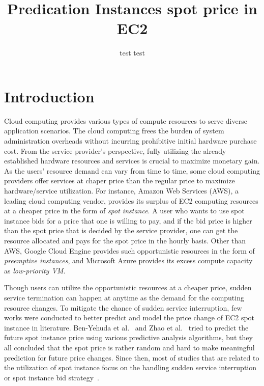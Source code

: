 \documentclass[graybox]{svmult}
\begin{document}
\title*{Predication Instances spot price in EC2}
\author{test test}
%
%
\maketitle


\section{Introduction}\label{sec:1}
Cloud computing provides various types of compute resources to serve diverse application scenarios. The cloud computing frees the burden of system administration overheads without incurring prohibitive initial hardware purchase cost. From the service provider's perspective, fully utilizing the already established hardware resources and services is crucial to maximize monetary gain. As the users' resource demand can vary from time to time, some cloud computing providers offer services at chaper price than the regular price to maximize hardware/service utilization. For instance, Amazon Web Services (AWS), a leading cloud computing vendor, provides its surplus of EC2 computing resources at a cheaper price in the form of \emph{spot instance}. A user who wants to use spot instance bids for a price that one is willing to pay, and if the bid price is higher than the spot price that is decided by the service provider, one can get the resource allocated and pays for the spot price in the hourly basis. Other than AWS, Google Cloud Engine provides such opportunistic resources in the form of \emph{preemptive instances}, and Microsoft Azure provides its excess compute capacity as \emph{low-priority VM}.

Though users can utilize the opportunistic resources at a cheaper price, sudden service termination can happen at anytime as the demand for the computing resource changes. To mitigate the chance of sudden service interruption, few works were conducted to better predict and model the price change of EC2 spot instance in literature. Ben-Yehuda et al.~\cite{spot-instance-pricing-analysis} and Zhao et al.~\cite{spot-price-han-arima} tried to predict the future spot instance price using various predictive analysis algorithms, but they all concluded that the spot price is rather random and hard to make meaningful prediction for future price changes. Since then, most of studies that are related to the utilization of spot instance focus on the handling sudden service interruption~\cite{tr-spark,spot-mpi-checkpoint,flint,deep-spot-cloud} or spot instance bid strategy~\cite{not-bid-cloud,how-to-bid-cloud}. 
\end{document}
